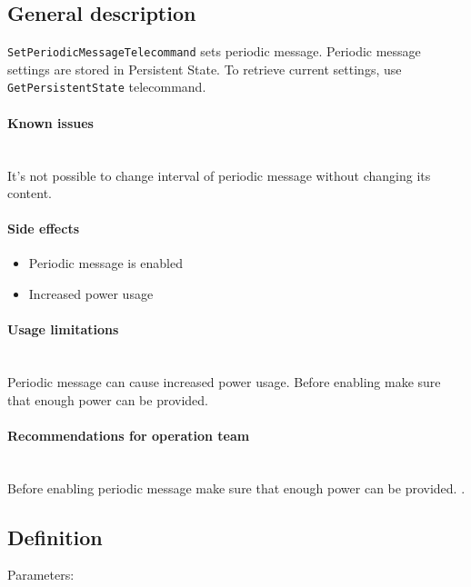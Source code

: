 

\subsection{General description}
\texttt{SetPeriodicMessageTelecommand} sets periodic message. Periodic message settings are stored in Persistent State. To retrieve current settings, use \texttt{GetPersistentState} telecommand. 

\paragraph{Known issues} \mbox{} \\
It's not possible to change interval of periodic message without changing its content.

\paragraph{Side effects}
\begin{itemize}
	\item Periodic message is enabled
	\item Increased power usage
\end{itemize}

\paragraph{Usage limitations} \mbox{} \\
Periodic message can cause increased power usage. Before enabling make sure that enough power can be provided.

\paragraph{Recommendations for operation team} \mbox{} \\
Before enabling periodic message make sure that enough power can be provided. .

\subsection{Definition}

Parameters:

